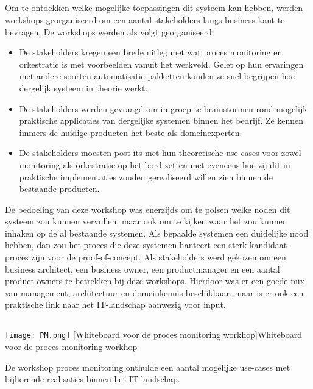 \subsection{}%
\label{subsec:opzet func}
Om te ontdekken welke mogelijke toepassingen dit systeem kan hebben, werden workshops georganiseerd om een aantal stakeholders langs business kant te bevragen. De workshops werden als volgt georganiseerd:
\begin{itemize}
  \item De stakeholders kregen een brede uitleg met wat proces monitoring en orkestratie is met voorbeelden vanuit het werkveld. Gelet op hun ervaringen met andere soorten automatisatie pakketten konden ze snel begrijpen hoe dergelijk systeem in theorie werkt.
  \item De stakeholders werden gevraagd om in groep te brainstormen rond mogelijk praktische applicaties van dergelijke systemen binnen het bedrijf. Ze kennen immers de huidige producten het beste als domeinexperten.
  \item De stakeholders moesten post-its met hun theoretische use-cases voor zowel monitoring als orkestratie op het bord zetten met eveneens hoe zij dit in praktische implementaties zouden gerealiseerd willen zien binnen de bestaande producten.
\end{itemize}
De bedoeling van deze workshop was enerzijds om te polsen welke noden dit systeem zou kunnen vervullen, maar ook om te kijken waar het zou kunnen inhaken op de al bestaande systemen. Als bepaalde systemen een duidelijke nood hebben, dan zou het proces die deze systemen hanteert een sterk kandidaat-proces zijn voor de proof-of-concept. Als stakeholders werd gekozen om een business architect, een business owner, een productmanager en een aantal product owners te betrekken bij deze workshops. Hierdoor was er een goede mix van management, architectuur en domeinkennis beschikbaar, maar is er ook een praktische link naar het IT-landschap aanwezig voor input.


\subsection{}%
\label{subsec:workshop proces monitoring}
\begin{center}
  \captionsetup{type=figure}
  \texttt{[image: PM.png]}
  [Whiteboard voor de proces monitoring workhop]{Whiteboard voor de proces monitoring workhop}
\end{center}
De workshop proces monitoring onthulde een aantal mogelijke use-cases met bijhorende realisaties binnen het IT-landschap.\newline

